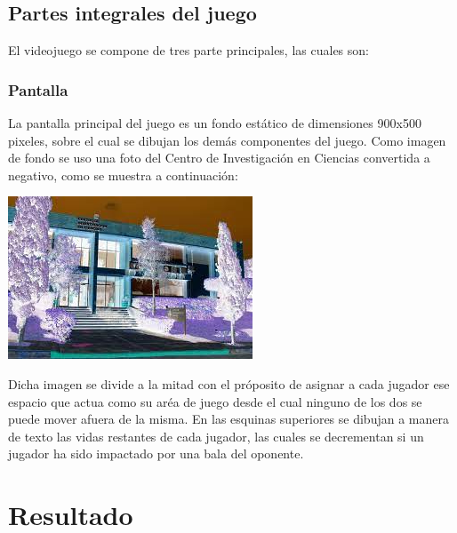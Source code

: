 \documentclass[12pt,letterpaper]{report}
\begin{document}
\section{Partes integrales del juego}
El videojuego se compone de tres parte principales, las cuales son:

\subsection{Pantalla}
La pantalla principal del juego es un fondo estático de dimensiones 900x500 pixeles, sobre el cual se dibujan los demás componentes del juego. Como imagen de fondo se uso una foto del Centro de Investigación en Ciencias convertida a negativo, como se muestra a continuación:
\begin{center}
\includegraphics[scale=0.5]{negative_cinc.png} 
\end{center} 
Dicha imagen se divide a la mitad con el próposito de asignar a cada jugador ese espacio que actua como su aréa de juego desde el cual ninguno de los dos se puede mover afuera de la misma.\newline
En las esquinas superiores se dibujan a manera de texto las vidas restantes de cada jugador, las cuales se decrementan si un jugador ha sido impactado por una bala del oponente.




\chapter{Resultado}
\end{document}
